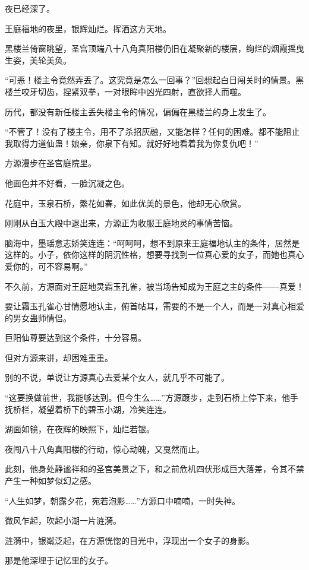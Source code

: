 \begin{this_body}
夜已经深了。

王庭福地的夜里，银辉灿烂。挥洒这方天地。

黑楼兰倚窗眺望，圣宫顶端八十八角真阳楼仍旧在凝聚新的楼层，绚烂的烟霞摇曳生姿，美轮美奂。

“可恶！楼主令竟然弄丢了。这究竟是怎么一回事？”回想起白日闯关时的情景。黑楼兰咬牙切齿，捏紧双拳，一对眼眸中凶光四射，直欲择人而噬。

历代，都没有新任楼主丢失楼主令的情况，偏偏在黑楼兰的身上发生了。

“不管了！没有了楼主令，用不了杀招灰融，又能怎样？任何的困难。都不能阻止我取得力道仙蛊！娘亲，你泉下有知。就好好地看着我为你复仇吧！”

方源漫步在圣宫庭院里。

他面色并不好看，一脸沉凝之色。

花庭中，玉泉石桥，繁花如春，如此优美的景色，他却无心欣赏。

刚刚从白玉大殿中退出来，方源正为收服王庭地灵的事情苦恼。

脑海中，墨瑶意志娇笑连连：“呵呵呵，想不到原来王庭福地认主的条件，居然是这样的。小子，依你这样的阴沉性格，想要寻找到一位真心爱的女子，而她也真心爱你的，可不容易啊。”

不久前，方源面对王庭地灵霜玉孔雀，被当场告知成为王庭之主的条件——真爱！

要让霜玉孔雀心甘情愿地认主，俯首帖耳，需要的不是一个人，而是一对真心相爱的男女蛊师情侣。

巨阳仙尊要达到这个条件，十分容易。

但对方源来讲，却困难重重。

别的不说，单说让方源真心去爱某个女人，就几乎不可能了。

“这要换做前世，我能够达到。但今生么……”方源踱步，走到石桥上停下来，他手抚桥栏，凝望着桥下的碧玉小湖，冷笑连连。

湖面如镜，在夜辉的映照下，灿烂若银。

夜闯八十八角真阳楼的行动，惊心动魄，又戛然而止。

此刻，他身处静谧祥和的圣宫美景之下，和之前危机四伏形成巨大落差，令其不禁产生一种如梦似幻之感。

“人生如梦，朝露夕花，宛若泡影……”方源口中喃喃，一时失神。

微风乍起，吹起小湖一片涟漪。

涟漪中，银粼泛起，在方源恍惚的目光中，浮现出一个女子的身影。

那是他深埋于记忆里的女子。


\end{this_body}
